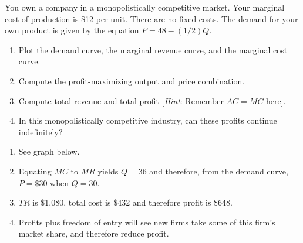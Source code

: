\begin{enumialphparenastyle}
\begin{econex}\label{ex:ch11ex2}
You own a company in a monopolistically competitive market. Your marginal cost of production is \$12 per unit. There are no fixed costs. The demand for your own product is given by the equation $P=48-(1/2)Q$.
\begin{enumerate}
\item	Plot the demand curve, the marginal revenue curve, and the marginal cost curve.
\item	Compute the profit-maximizing output and price combination.
\item	Compute total revenue and total profit [\textit{Hint}: Remember $AC=MC$ here].
\item	In this monopolistically competitive industry, can these profits continue indefinitely?
\end{enumerate}
\begin{econsolution}
\begin{enumerate}
\item	See graph below.
\item	Equating $MC$ to $MR$ yields $Q=36$ and therefore, from the demand curve, $P=\$30$ when $Q=30$.
\item	$TR$ is \$1,080, total cost is \$432 and therefore profit is \$648.
\item	Profits plus freedom of entry will see new firms take some of this firm's market share, and therefore reduce profit.
\end{enumerate}
\begin{center*}
\end{center*}
\end{econsolution}
\end{econex}


\end{enumialphparenastyle}
